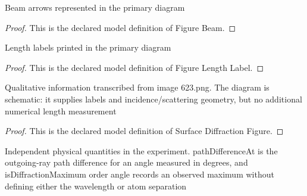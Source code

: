 \begin{definition}
  \label{def:physics:phyx-mini-0623:phyxminiproblems-problemphyxmini0623-figurebeam}
  Beam arrows represented in the primary diagram
\end{definition}
\begin{proof}
  This is the declared model definition of Figure Beam.
\end{proof}
\begin{definition}
  \label{def:physics:phyx-mini-0623:phyxminiproblems-problemphyxmini0623-figurelengthlabel}
  Length labels printed in the primary diagram
\end{definition}
\begin{proof}
  This is the declared model definition of Figure Length Label.
\end{proof}
\begin{definition}
  \label{def:physics:phyx-mini-0623:phyxminiproblems-problemphyxmini0623-surfacediffractionfigure}
  Qualitative information transcribed from image 623.png. The diagram is schematic: it supplies labels and incidence/scattering geometry, but no additional numerical length measurement
\end{definition}
\begin{proof}
  This is the declared model definition of Surface Diffraction Figure.
\end{proof}
\begin{definition}
  \label{def:physics:phyx-mini-0623:phyxminiproblems-problemphyxmini0623-electronsurfacediffractionsetup}
  Independent physical quantities in the experiment. pathDifferenceAt is the outgoing-ray path difference for an angle measured in degrees, and isDiffractionMaximum order angle records an observed maximum without defining either the wavelength or atom separation
\end{definition}
